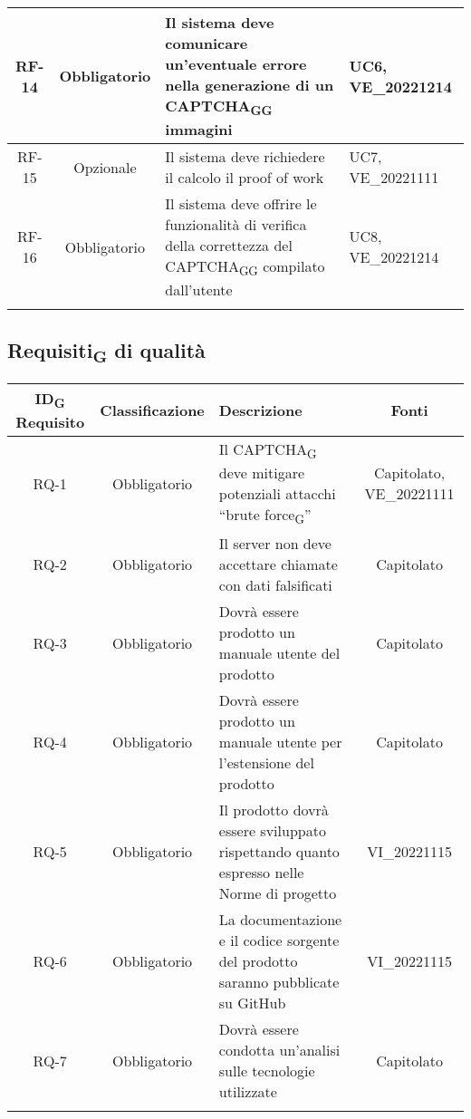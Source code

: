 \begin{tabularx}{\textwidth}{| c | c | X | X |}
 \hline
 RF-14 & Obbligatorio & Il sistema deve comunicare un'eventuale errore nella generazione di un CAPTCHA\textsubscript{G}\textsubscript{G} immagini & UC6, VE\_20221214\\
 \hline
 RF-15 & Opzionale & Il sistema deve richiedere il calcolo il proof of work & UC7, VE\_20221111\\
 \hline
 RF-16 & Obbligatorio & Il sistema deve offrire le funzionalità di verifica della correttezza del CAPTCHA\textsubscript{G}\textsubscript{G} compilato dall'utente & UC8, VE\_20221214\\
 \hline
 \caption{Requisiti\textsubscript{G} funzionali}
\end{tabularx}

\subsection{Requisiti\textsubscript{G} di qualità}
\renewcommand\tabularxcolumn[1]{>{\Centering}m{#1}}
\begin{tabularx}{\textwidth}{| c | c | X | c |} 
 \hline
 \textbf{ID\textsubscript{G} Requisito} & \textbf{Classificazione} & \textbf{Descrizione} & \textbf{Fonti} \\
 \hline
 RQ-1 & Obbligatorio & Il CAPTCHA\textsubscript{G} deve mitigare potenziali attacchi “brute force\textsubscript{G}” & Capitolato, VE\_20221111\\
 \hline
  RQ-2 & Obbligatorio & Il server non deve accettare chiamate con dati falsificati & Capitolato\\
 \hline
 RQ-3 & Obbligatorio & Dovrà essere prodotto un manuale utente del prodotto & Capitolato\\
 \hline
 RQ-4 & Obbligatorio & Dovrà essere prodotto un manuale utente per l'estensione del prodotto &  Capitolato\\
 \hline
 RQ-5 & Obbligatorio & Il prodotto dovrà essere sviluppato rispettando quanto espresso nelle Norme di progetto & VI\_20221115\\
 \hline
 RQ-6 & Obbligatorio & La documentazione e il codice sorgente del prodotto saranno pubblicate su GitHub & VI\_20221115\\
 \hline
 RQ-7 & Obbligatorio & Dovrà essere condotta un'analisi sulle tecnologie utilizzate & Capitolato\\
 \hline
 \caption{Requisiti\textsubscript{G} di qualità}
\end{tabularx}

